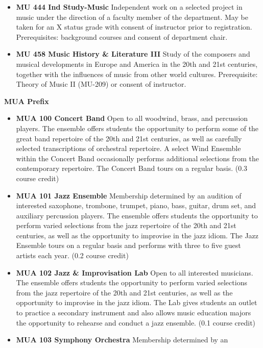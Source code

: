 \documentclass[
  letterpaper,
]{scrbook}
\providecommand{\tightlist}{%
  \setlength{\itemsep}{0pt}\setlength{\parskip}{0pt}}
\begin{document}
\begin{itemize}
\item
  \textbf{MU 444 Ind Study-Music} Independent work on a selected project
  in music under the direction of a faculty member of the department.
  May be taken for an X status grade with consent of instructor prior to
  registration. Prerequisites: background courses and consent of
  department chair.
\item
  \textbf{MU 458 Music History \& Literature III} Study of the composers
  and musical developments in Europe and America in the 20th and 21st
  centuries, together with the influences of music from other world
  cultures. Prerequisite: Theory of Music II (MU-209) or consent of
  instructor.
\end{itemize}

\textbf{MUA Prefix}

\begin{itemize}
\tightlist
\item
  \textbf{MUA 100 Concert Band} Open to all woodwind, brass, and
  percussion players. The ensemble offers students the opportunity to
  perform some of the great band repertoire of the 20th and 21st
  centuries, as well as carefully selected transcriptions of orchestral
  repertoire. A select Wind Ensemble within the Concert Band
  occasionally performs additional selections from the contemporary
  repertoire. The Concert Band tours on a regular basis. (0.3 course
  credit)
\item
  \textbf{MUA 101 Jazz Ensemble} Membership determined by an audition of
  interested saxophone, trombone, trumpet, piano, bass, guitar, drum
  set, and auxiliary percussion players. The ensemble offers students
  the opportunity to perform varied selections from the jazz repertoire
  of the 20th and 21st centuries, as well as the opportunity to
  improvise in the jazz idiom. The Jazz Ensemble tours on a regular
  basis and performs with three to five guest artists each year. (0.2
  course credit)
\item
  \textbf{MUA 102 Jazz \& Improvisation Lab} Open to all interested
  musicians. The ensemble offers students the opportunity to perform
  varied selections from the jazz repertoire of the 20th and 21st
  centuries, as well as the opportunity to improvise in the jazz idiom.
  The Lab gives students an outlet to practice a secondary instrument
  and also allows music education majors the opportunity to rehearse and
  conduct a jazz ensemble. (0.1 course credit)
\item
  \textbf{MUA 103 Symphony Orchestra} Membership determined by an

\end{itemize}
\end{document}
